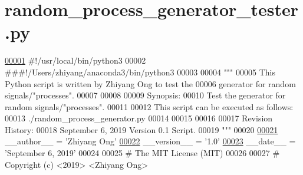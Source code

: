 \hypertarget{random__process__generator__tester_8py_source}{}\section{random\+\_\+process\+\_\+generator\+\_\+tester.\+py}
\label{random__process__generator__tester_8py_source}

\begin{DoxyCode}
\hypertarget{random__process__generator__tester_8py_source_l00001}{}\hyperlink{namespacerandom__process__models_1_1random__process__generator__tester}{00001} \textcolor{comment}{#!/usr/local/bin/python3}
00002 \textcolor{comment}{###!/Users/zhiyang/anaconda3/bin/python3}
00003 
00004 \textcolor{stringliteral}{"""}
00005 \textcolor{stringliteral}{    This Python script is written by Zhiyang Ong to test the}
00006 \textcolor{stringliteral}{        generator for random signals/"processes".}
00007 \textcolor{stringliteral}{}
00008 \textcolor{stringliteral}{}
00009 \textcolor{stringliteral}{    Synopsis:}
00010 \textcolor{stringliteral}{    Test the generator for random signals/"processes".}
00011 \textcolor{stringliteral}{}
00012 \textcolor{stringliteral}{    This script can be executed as follows:}
00013 \textcolor{stringliteral}{    ./random\_process\_generator.py}
00014 \textcolor{stringliteral}{}
00015 \textcolor{stringliteral}{}
00016 \textcolor{stringliteral}{}
00017 \textcolor{stringliteral}{    Revision History:}
00018 \textcolor{stringliteral}{    September 6, 2019           Version 0.1 Script.}
00019 \textcolor{stringliteral}{"""}
00020 
\hypertarget{random__process__generator__tester_8py_source_l00021}{}\hyperlink{namespacerandom__process__models_1_1random__process__generator__tester_a533d9611b280d2c9d3154e7ddea602f0}{00021} \_\_author\_\_ = \textcolor{stringliteral}{'Zhiyang Ong'}
\hypertarget{random__process__generator__tester_8py_source_l00022}{}\hyperlink{namespacerandom__process__models_1_1random__process__generator__tester_a6d64c35578abb54108b6261a9a668bbe}{00022} \_\_version\_\_ = \textcolor{stringliteral}{'1.0'}
\hypertarget{random__process__generator__tester_8py_source_l00023}{}\hyperlink{namespacerandom__process__models_1_1random__process__generator__tester_a0535cc1b4a76908d454a4480982fd703}{00023} \_\_date\_\_ = \textcolor{stringliteral}{'September 6, 2019'}
00024 
00025 \textcolor{comment}{#   The MIT License (MIT)}
00026 
00027 \textcolor{comment}{#   Copyright (c) <2019> <Zhiyang Ong>}

\end{DoxyCode}
